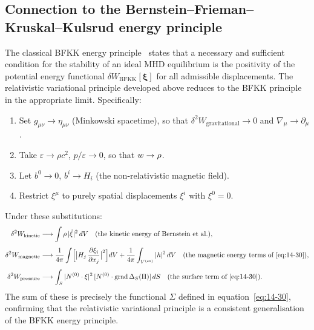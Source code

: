 \subsection{Connection to the Bernstein--Frieman--Kruskal--Kulsrud
  energy principle}\label{sec:rel-122-BFKK}

The classical BFKK energy principle~\citep{Bernstein1958} states that
a necessary and sufficient condition for the stability of an ideal
MHD equilibrium is the positivity of the potential energy functional
$\delta W_{\mathrm{BFKK}}[\boldsymbol{\xi}]$ for all admissible
displacements.  The relativistic variational principle developed above
reduces to the BFKK principle in the appropriate limit.  Specifically:

\begin{enumerate}
\item Set $g_{\mu\nu}\to\eta_{\mu\nu}$ (Minkowski spacetime), so that
  $\delta^{2}W_{\mathrm{gravitational}}\to 0$ and
  $\nabla_{\mu}\to\partial_{\mu}$.

\item Take $\varepsilon\to\rho c^{2}$, $p/\varepsilon\to 0$, so that
  $\enthalpy\to\rho$.

\item Let $b^{0}\to 0$, $b^{i}\to H_{i}$ (the non-relativistic
  magnetic field).

\item Restrict $\xi^{\mu}$ to purely spatial displacements
  $\xi^{i}$ with $\xi^{0}=0$.
\end{enumerate}

Under these substitutions:
\begin{align}
  \delta^{2}W_{\mathrm{kinetic}}
  &\longrightarrow
  \int \rho\,|\dot{\boldsymbol{\xi}}|^{2}\,dV
  \quad\text{(the kinetic energy of Bernstein et al.)},
  \label{eq:rel14-BFKK-K}\\[4pt]
  \delta^{2}W_{\mathrm{magnetic}}
  &\longrightarrow
  \frac{1}{4\pi}\int\Bigl[\bigl|H_{j}\,
    \frac{\partial\xi_{i}}{\partial x_{j}}\bigr|^{2}\Bigr]dV
  + \frac{1}{4\pi}\int_{V^{(\mathrm{ex})}}|\mathbf{h}|^{2}\,dV
  \quad\text{(the magnetic energy terms of~\eqref{eq:14-30})},
  \label{eq:rel14-BFKK-M}\\[4pt]
  \delta^{2}W_{\mathrm{pressure}}
  &\longrightarrow
  \int_{S}|\mathbf{N}^{(0)}\cdot\boldsymbol{\xi}|^{2}\,
    [\mathbf{N}^{(0)}\cdot\operatorname{grad}\Delta_{S}(\Pi)]\,dS
  \quad\text{(the surface term of~\eqref{eq:14-30})}.
  \label{eq:rel14-BFKK-S}
\end{align}
The sum of these is precisely the functional $\Sigma$ defined in
equation~\eqref{eq:14-30}, confirming that the relativistic
variational principle is a consistent generalisation of the BFKK
energy principle.

